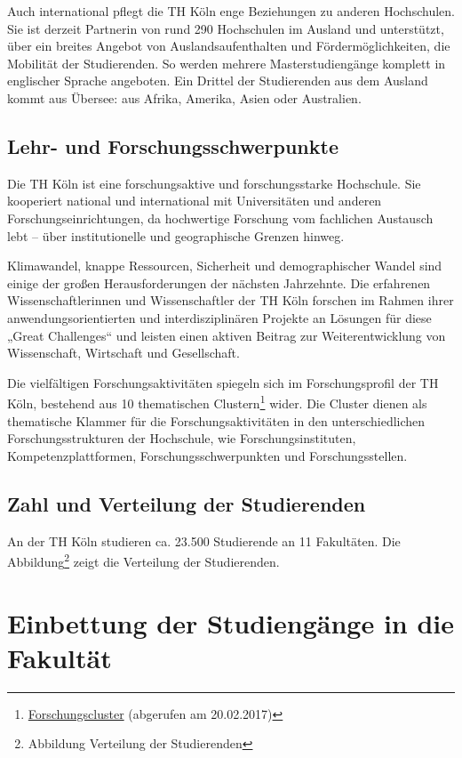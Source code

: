 Auch international pflegt die TH Köln enge Beziehungen zu anderen
Hochschulen. Sie ist derzeit Partnerin von rund 290 Hochschulen im
Ausland und unterstützt, über ein breites Angebot von
Auslandsaufenthalten und Fördermöglichkeiten, die Mobilität der
Studierenden. So werden mehrere Masterstudiengänge komplett in
englischer Sprache angeboten. Ein Drittel der Studierenden aus dem
Ausland kommt aus Übersee: aus Afrika, Amerika, Asien oder Australien.

\subsection{Lehr- und
Forschungsschwerpunkte}\label{lehr--und-forschungsschwerpunkte}

Die TH Köln ist eine forschungsaktive und forschungsstarke Hochschule.
Sie kooperiert national und international mit Universitäten und anderen
Forschungseinrichtungen, da hochwertige Forschung vom fachlichen
Austausch lebt -- über institutionelle und geographische Grenzen hinweg.

Klimawandel, knappe Ressourcen, Sicherheit und demographischer Wandel
sind einige der großen Herausforderungen der nächsten Jahrzehnte. Die
erfahrenen Wissenschaftlerinnen und Wissenschaftler der TH Köln forschen
im Rahmen ihrer anwendungsorientierten und interdisziplinären Projekte
an Lösungen für diese „Great Challenges`` und leisten einen aktiven
Beitrag zur Weiterentwicklung von Wissenschaft, Wirtschaft und
Gesellschaft.

Die vielfältigen Forschungsaktivitäten spiegeln sich im Forschungsprofil
der TH Köln, bestehend aus 10 thematischen Clustern\footnote{\href{https://www.th-koeln.de/forschung/cluster_2734.php}{Forschungscluster}
  (abgerufen am 20.02.2017)} wider. Die Cluster dienen als thematische
Klammer für die Forschungsaktivitäten in den unterschiedlichen
Forschungsstrukturen der Hochschule, wie Forschungsinstituten,
Kompetenzplattformen, Forschungsschwerpunkten und Forschungsstellen.

\subsection{Zahl und Verteilung der
Studierenden}\label{zahl-und-verteilung-der-studierenden}

An der TH Köln studieren ca. 23.500 Studierende an 11 Fakultäten. Die
Abbildung\footnote{Abbildung Verteilung der Studierenden} zeigt die
Verteilung der Studierenden.

\section{Einbettung der Studiengänge in die
Fakultät}\label{einbettung-der-studienguxe4nge-in-die-fakultuxe4t}

